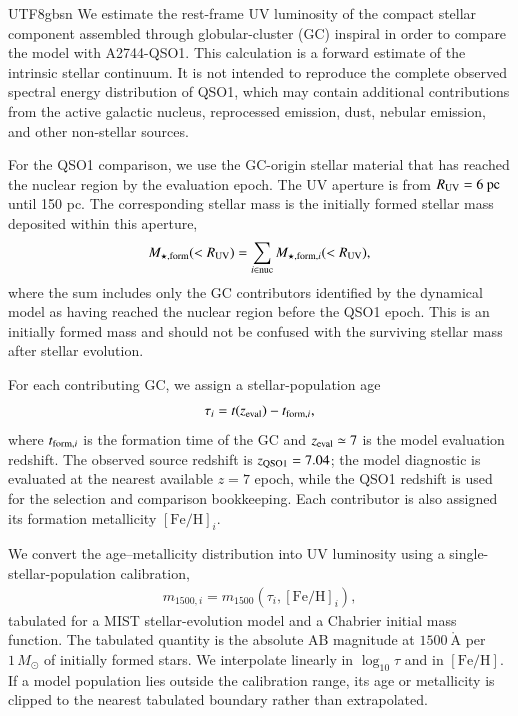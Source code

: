 \documentclass[trackchanges, twocolappendix, twocolumn]{aastex701}
\begin{document}
\begin{CJK*}{UTF8}{gbsn}
We estimate the rest-frame UV luminosity of the compact stellar component
assembled through globular-cluster (GC) inspiral in order to compare the
model with A2744-QSO1. This calculation is a forward estimate of the
intrinsic stellar continuum. It is not intended to reproduce the complete
observed spectral energy distribution of QSO1, which may contain additional
contributions from the active galactic nucleus, reprocessed emission, dust,
nebular emission, and other non-stellar sources.

For the QSO1 comparison, we use the GC-origin stellar material that has
reached the nuclear region by the evaluation epoch. The UV aperture is from $R_{\rm UV}=6~{\rm pc}$ until 150 pc. The corresponding stellar mass is the initially formed stellar mass deposited within this aperture,
\begin{align}
M_{\star,{\rm form}}(<R_{\rm UV})
 =
 \sum_{i\in{\rm nuc}}
 M_{{\star,{\rm form}},i}(<R_{\rm UV}),
\end{align}
where the sum includes only the GC contributors identified by the dynamical
model as having reached the nuclear region before the QSO1 epoch. This is an
initially formed mass and should not be confused with the surviving stellar
mass after stellar evolution.

For each contributing GC, we assign a stellar-population age
\begin{align}
\tau_i=t(z_{\rm eval})-t_{{\rm form},i},
\end{align}
where $t_{{\rm form},i}$ is the formation time of the GC and
$z_{\rm eval}\simeq7$ is the model evaluation redshift. The observed source
redshift is $z_{\rm QSO1}=7.04$; the model diagnostic is evaluated at the
nearest available $z=7$ epoch, while the QSO1 redshift is used for the
selection and comparison bookkeeping. Each contributor is also assigned its
formation metallicity $[\mathrm{Fe/H}]_i$.

We convert the age--metallicity distribution into UV luminosity using a
single-stellar-population calibration,
\begin{align}
m_{1500,i}
 =
m_{1500}\!\left(\tau_i,[\mathrm{Fe/H}]_i\right),
\end{align}
tabulated for a MIST stellar-evolution model and a Chabrier initial mass
function. The tabulated quantity is the absolute AB magnitude at
$1500~\mathring{\mathrm{A}}$ per $1\,M_\odot$ of initially formed stars.
We interpolate linearly in $\log_{10}\tau$ and in $[\mathrm{Fe/H}]$. If a
model population lies outside the calibration range, its age or metallicity
is clipped to the nearest tabulated boundary rather than extrapolated.


\end{CJK*}
\end{document}
